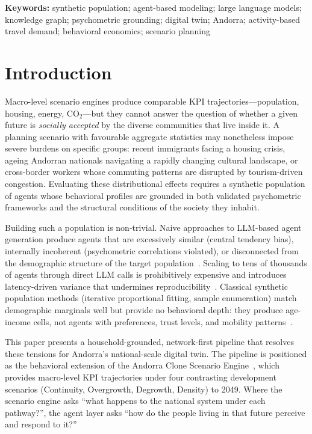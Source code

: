 \documentclass[a4paper,12pt]{article}
\begin{document}
\noindent\textbf{Keywords:} synthetic population; agent-based modeling; large language
models; knowledge graph; psychometric grounding; digital twin; Andorra;
activity-based travel demand; behavioral economics; scenario planning

\section{Introduction}
\label{sec:introduction}

Macro-level scenario engines produce comparable KPI trajectories---population,
housing, energy, CO$_2$---but they cannot answer the question of whether a
given future is \emph{socially accepted} by the diverse communities that live
inside it. A planning scenario with favourable aggregate statistics may
nonetheless impose severe burdens on specific groups: recent immigrants facing
a housing crisis, ageing Andorran nationals navigating a rapidly changing
cultural landscape, or cross-border workers whose commuting patterns are
disrupted by tourism-driven congestion. Evaluating these distributional
effects requires a synthetic population of agents whose behavioral profiles
are grounded in both validated psychometric frameworks and the structural
conditions of the society they inhabit.

Building such a population is non-trivial. Naive approaches to LLM-based
agent generation produce agents that are excessively similar (central tendency
bias), internally incoherent (psychometric correlations violated), or
disconnected from the demographic structure of the target
population~\cite{argyle2023outstuffing,park2023generative}. Scaling to tens
of thousands of agents through direct LLM calls is prohibitively expensive and
introduces latency-driven variance that undermines
reproducibility~\cite{adornetto2025generative}. Classical synthetic population
methods (iterative proportional fitting, sample enumeration) match demographic
marginals well but provide no behavioral depth: they produce age-income cells,
not agents with preferences, trust levels, and mobility
patterns~\cite{muller2021synthetic,axhausen2016population}.

This paper presents a household-grounded, network-first pipeline that resolves
these tensions for Andorra's national-scale digital twin. The pipeline is
positioned as the behavioral extension of the Andorra Clone Scenario
Engine~\cite{bartumeu2026andorra},
which provides macro-level KPI trajectories under four contrasting development
scenarios (Continuity, Overgrowth, Degrowth, Density) to 2049. Where the
scenario engine asks ``what happens to the national system under each
pathway?'', the agent layer asks ``how do the people living in that future
perceive and respond to it?''
\end{document}
